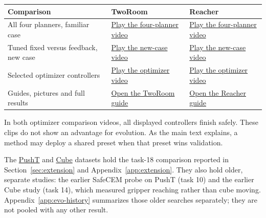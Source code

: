\begin{center}\small
\begin{tabularx}{\textwidth}{lXX}
\toprule
Comparison & TwoRoom & Reacher \\
\midrule
All four planners, familiar case &
\href{https://huggingface.co/datasets/Sachioster/SafetyDial-TwoRoom/blob/bed33b8967c30728dd76bfbdd4a046a6c34cedf8/campaigns/lewm16/videos/comparisons/A-paired-high-margin.mp4}{Play the four-planner video} &
\href{https://huggingface.co/datasets/Sachioster/SafetyDial-Reacher/blob/12624bc18843f0826566c4f1408d9028b2c61616/campaigns/lewm16/videos/comparisons/A-paired-high-margin.mp4}{Play the four-planner video} \\
Tuned fixed versus feedback, new case &
\href{https://huggingface.co/datasets/Sachioster/SafetyDial-TwoRoom/blob/bed33b8967c30728dd76bfbdd4a046a6c34cedf8/campaigns/lewm16/videos/comparisons/B-paired-high-margin.mp4}{Play the new-case video} &
\href{https://huggingface.co/datasets/Sachioster/SafetyDial-Reacher/blob/12624bc18843f0826566c4f1408d9028b2c61616/campaigns/lewm16/videos/comparisons/B-paired-high-margin.mp4}{Play the new-case video} \\
Selected optimizer controllers &
\href{https://huggingface.co/datasets/Sachioster/SafetyDial-TwoRoom/blob/bed33b8967c30728dd76bfbdd4a046a6c34cedf8/campaigns/lewm17/videos/comparisons/H-paired-high-margin.mp4}{Play the optimizer video} &
\href{https://huggingface.co/datasets/Sachioster/SafetyDial-Reacher/blob/12624bc18843f0826566c4f1408d9028b2c61616/campaigns/lewm17/videos/comparisons/H-paired-high-margin.mp4}{Play the optimizer video} \\
Guides, pictures and full results &
\href{https://huggingface.co/datasets/Sachioster/SafetyDial-TwoRoom}{Open the TwoRoom guide} &
\href{https://huggingface.co/datasets/Sachioster/SafetyDial-Reacher}{Open the Reacher guide} \\
\bottomrule
\end{tabularx}
\end{center}

In both optimizer comparison videos, all displayed controllers finish safely.
These clips do not show an advantage for evolution. As the main text
explains, a method may deploy a shared preset when that preset wins
validation.

The \href{https://huggingface.co/datasets/Sachioster/SafetyDial-PushT}{PushT}
and \href{https://huggingface.co/datasets/Sachioster/SafetyDial-Cube}{Cube}
datasets hold the task-18 comparison reported in Section~\ref{sec:extension}
and Appendix~\ref{app:extension}. They also hold older, separate studies:
the earlier SafeCEM probe on PushT (task 10) and the earlier Cube study
(task 14), which measured gripper reaching rather than cube moving. Appendix~\ref{app:evo-history} summarizes those older searches separately;
they are not pooled with any other result.
